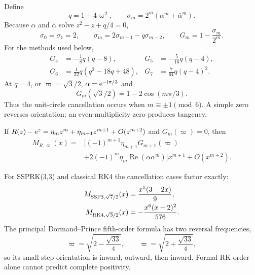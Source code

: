 Define
\begin{equation}
 q=1+4\varpi^2,
 \qquad
 \sigma_m=2^m(\alpha^m+\bar\alpha^m).
 \label{eq:sigma_definition}
\end{equation}
Because $\alpha$ and $\bar\alpha$ solve $z^2-z+q/4=0$,
\begin{equation}
 \sigma_0=\sigma_1=2,
 \qquad
 \sigma_m=2\sigma_{m-1}-q\sigma_{m-2},
 \qquad
 G_m=1-\frac{\sigma_m}{2^m}.
 \label{eq:G_recurrence}
\end{equation}
For the methods used below,
\begin{align}
 G_4&=-\frac18q(q-8),
 &G_5&=-\frac5{16}q(q-4),\nonumber\\
 G_6&=\frac1{32}q(q^2-18q+48),
 &G_7&=\frac7{64}q(q-4)^2.
 \label{eq:G_factors}
\end{align}
At $q=4$, or $\varpi=\sqrt3/2$, $\alpha=\mathrm{e}^{-\mathrm{i}\pi/3}$ and
\begin{equation}
 G_m(\sqrt3/2)=1-2\cos(m\pi/3).
 \label{eq:unit_circle_rule}
\end{equation}
Thus the unit-circle cancellation occurs when $m\equiv\pm1\pmod6$. A simple zero reverses orientation; an even-multiplicity zero produces tangency.

\begin{proposition}
\label{prop:degenerate}
If $R(z)-\mathrm{e}^z=\eta_mz^m+\eta_{m+1}z^{m+1}+O(z^{m+2})$ and $G_m(\varpi)=0$, then
\begin{align}
 M_{R,\varpi}(x)
 ={}&\Big[(-1)^{m+1}\eta_{m+1}G_{m+1}(\varpi)\nonumber\\
 &+2(-1)^m\eta_m\operatorname{Re}(\bar\alpha\alpha^m)\Big]x^{m+1}
 +O(x^{m+2}).
 \label{eq:degenerate_coefficient}
\end{align}
\end{proposition}

For SSPRK(3,3) and classical RK4 the cancellation cases factor exactly:
\begin{align}
 M_{{\rm SSP3},\sqrt7/2}(x)&=\frac{x^5(3-2x)}{9},\nonumber\\
 M_{{\rm RK4},\sqrt3/2}(x)&=-\frac{x^6(x-2)^2}{576}.
 \label{eq:threshold_factors}
\end{align}
The principal Dormand--Prince fifth-order formula \cite{DormandPrince1980} has two reversal frequencies,
\begin{equation}
 \varpi=\sqrt{2-\frac{\sqrt{33}}4},
 \qquad
 \varpi=\sqrt{2+\frac{\sqrt{33}}4},
 \label{eq:dp5_thresholds}
\end{equation}
so its small-step orientation is inward, outward, then inward. Formal RK order alone cannot predict complete positivity.
